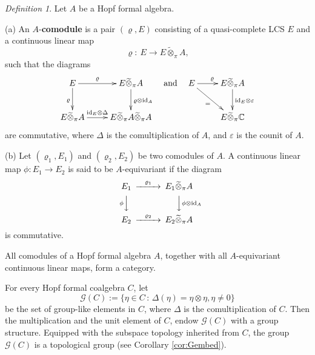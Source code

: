 \documentclass[12pt, a4paper]{amsart}
\newcommand{\BC}{{\mathbb {C}}}
\newcommand{\CG}{{\mathcal {G}}}
\newcommand{\CO}{{\mathcal {O}}}
\newcommand{\wt}{\widetilde}
\newcommand{\m}{\mathfrak m}
\newcommand{\be}{\begin {equation}}
\newcommand{\ee}{\end {equation}}
\newcommand{\qaq}{\quad\textrm{and}\quad}
\renewcommand{\mid}{\,:\,}
\theoremstyle{Theorem}
\theoremstyle{Theorem}
\theoremstyle{Theorem}
\theoremstyle{Theorem}
\theoremstyle{Plain}
\theoremstyle{remark}
\theoremstyle{remark}
\theoremstyle{Definition}
\newtheorem{dfn}{Definition}[section]
\numberwithin{equation}{section}
\begin{document}
\begin{dfn} Let $A$ be a Hopf formal algebra.  

\noindent (a) An $A$-\textbf{comodule} is a pair $(\varrho, E)$
consisting of a quasi-complete LCS  $E$ and a continuous linear map \[\varrho:\  E\rightarrow E\wt\otimes_{\pi} A,\]
such that the diagrams
\be\label{eq:RepchianruleofO}\xymatrix{
E
\ar[r]^-{\varrho}
\ar[d]_{\varrho}
&
E\wt\otimes_{\pi} A
\ar[d]^{\varrho \otimes \mathrm{id}_{A}}
\\
E\wt\otimes_{\pi} A
\ar[r]^-{\mathrm{id}_{E}\otimes \Delta}
&
E\wt\otimes_{\pi} A\wt\otimes_{\pi}A
} \qaq \xymatrix{E \ar[r]^{\varrho} \ar[rd]_{=} &E\wt\otimes_{\pi}A\ar[d]^{\mathrm{id}_E\otimes\varepsilon} \\ &E\wt\otimes_{\pi}\BC}\ee %
are commutative, where $\Delta$ is the comultiplication of  $A$, and $\varepsilon$ is the counit of $A$. 

\noindent(b) Let $(\varrho_1, E_1)$ and $(\varrho_2, E_2)$ be two comodules of $A$.
    A continuous linear map $\phi: E_1\rightarrow E_2$ is said to be  $A$-equivariant if the diagram 
    \[\begin{CD}
        E_1 @>\varrho_1>> E_1\wt\otimes_{\pi}A\\ @V\phi VV @VV\phi\otimes\mathrm{id}_{A} V \\ E_2 @>\varrho_2>> E_2\wt\otimes_{\pi}A
    \end{CD}\] is commutative. 
\end{dfn}
All comodules of a Hopf formal algebra $A$, together with all $A$-equivariant continuous linear maps, form a category. 

For every Hopf formal coalgebra $C$, let
\be\label{eq:LC}
\CG(C):=\{\eta\in C\mid \Delta(\eta)=\eta\otimes\eta, \eta\neq0\}
\ee be the set of group-like elements in $C$,
where $\Delta$ is the comultiplication of $C$. Then the multiplication and the unit element of $C$, endow $\CG(C)$ with a group structure. Equipped with the subspace topology inherited from $C$, the group $\CG(C)$ is a topological group (see Corollary \ref{cor:Gembed}).

\end{document}
